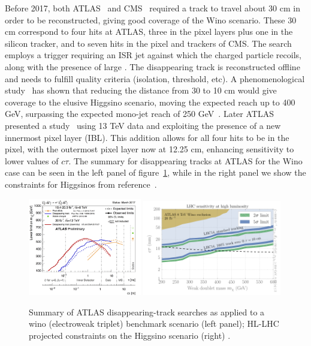 Before 2017, both ATLAS~\cite{Aad:2013yna} and CMS~\cite{CMS:2014gxa} required a track to travel about 30 cm in order to be reconstructed, giving good coverage of the Wino scenario. These 30 cm correspond to four hits at ATLAS, three in the pixel layers plus one in the silicon tracker, and to seven hits in the pixel and trackers of CMS. The search employs a trigger requiring an ISR jet against which the charged particle recoils, along with the presence of large \met. The disappearing track is reconstructed offline and needs to fulfill quality criteria (isolation, \pT threshold, etc). A phenomenological study~\cite{Mahbubani:2017gjh} has shown that reducing the distance from 30 to 10 cm would give coverage to the elusive Higgsino scenario, moving the expected reach up to 400 GeV, surpassing the expected mono-jet reach of 250 GeV~\cite{Schwaller:2013baa,Low:2014cba,Barducci:2015ffa}. Later ATLAS presented a study~\cite{ATLAS-CONF-2017-017} using 13 TeV data and exploiting the presence of a new innermost pixel layer (IBL). This addition allows for all four hits to be in the pixel, with the outermost pixel layer now at 12.25 cm,  enhancing sensitivity to lower values of $c \tau$. The summary for disappearing tracks at ATLAS for the Wino case can be seen in the left panel of figure~\ref{fig:ewkinosearches}, while in the right panel we show the constraints for Higgsinos from reference~\cite{Mahbubani:2017gjh}.

\begin{figure}[t]
\centering
\includegraphics[width=0.44\textwidth]{plots/ATLAS_SUSY_LLPChargino.png}
\includegraphics[width=0.54\textwidth]{plots/Higgsino_Significance14}
\caption{Summary of ATLAS disappearing-track searches as applied to a wino (electroweak triplet) benchmark scenario (left panel)\cite{ATLAS:summary};  HL-LHC projected constraints on the Higgsino scenario (right) \cite{Mahbubani:2017gjh}.}
  \label{fig:ewkinosearches}
\end{figure}

